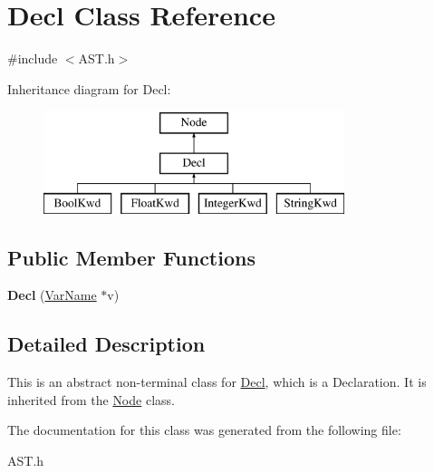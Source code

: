 \hypertarget{class_decl}{}\section{Decl Class Reference}
\label{class_decl}


{\ttfamily \#include $<$A\+S\+T.\+h$>$}

Inheritance diagram for Decl\+:\begin{figure}[H]
\begin{center}
\leavevmode
\includegraphics[height=3.000000cm]{class_decl}
\end{center}
\end{figure}
\subsection*{Public Member Functions}
\begin{DoxyCompactItemize}
\item 
\hypertarget{class_decl_a7c461a92d2ba11b1d14713c0edd1d4d9}{}{\bfseries Decl} (\hyperlink{class_var_name}{Var\+Name} $\ast$v)\label{class_decl_a7c461a92d2ba11b1d14713c0edd1d4d9}

\end{DoxyCompactItemize}


\subsection{Detailed Description}
This is an abstract non-\/terminal class for \hyperlink{class_decl}{Decl}, which is a Declaration. It is inherited from the \hyperlink{class_node}{Node} class. 

The documentation for this class was generated from the following file\+:\begin{DoxyCompactItemize}
\item 
A\+S\+T.\+h\end{DoxyCompactItemize}
